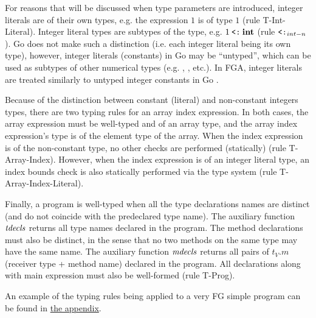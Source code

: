 For reasons that will be discussed when type parameters are introduced, integer
literals are of their own types, e.g. the expression $1$ is of type $1$ (rule
T-Int-Literal). Integer literal types are subtypes of the  type, e.g. $1
    \mathbin{\texttt{<:}} \texttt{\bf int}$ (rule $\mathbin{\texttt{<:}}_{int-n}$). Go does not make such a distinction (i.e.
each integer literal being its own type), however, integer literals (constants)
in Go may be ``untyped'', which can be used as subtypes of other numerical types
(e.g. , ,  etc.). In FGA, integer literals are
treated similarly to untyped integer constants in Go \autocite{spec}.

Because of the distinction between constant (literal) and non-constant integers
types, there are two typing rules for an array index expression. In both cases,
the array expression must be well-typed and of an array type, and the array
index expression's type is of the element type of the array. When the index
expression is of the non-constant  type, no other checks are performed
(statically) (rule T-Array-Index). However, when the index expression is of an
integer literal type, an index bounds check is also statically performed via the
type system (rule T-Array-Index-Literal).

Finally, a program is well-typed when all the type declarations names are
distinct (and do not coincide with the predeclared  type name). The
auxiliary function $\mathit{tdecls}$ returns all type names declared in the program. The
method declarations must also be distinct, in the sense that no two methods on
the same type may have the same name. The auxiliary function $\mathit{mdecls}$ returns
all pairs of $t_V.m$ (receiver type + method name) declared in the program. All
declarations along with main expression must also be well-formed (rule T-Prog).

An example of the typing rules being applied to a very FG simple program can
be found in \hyperref[sec:fg-typing-derivation-example]{the appendix}.




